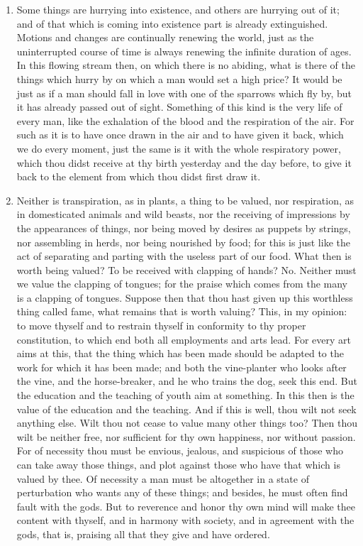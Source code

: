 \begin{enumerate}
\item Some things are hurrying into existence, and others are hurrying out of it; and of that which is coming into existence part is already extinguished. Motions and changes are continually renewing the world, just as the uninterrupted course of time is always renewing the infinite duration of ages. In this flowing stream then, on which there is no abiding, what is there of the things which hurry by on which a man would set a high price? It would be just as if a man should fall in love with one of the sparrows which fly by, but it has already passed out of sight. Something of this kind is the very life of every man, like the exhalation of the blood and the respiration of the air. For such as it is to have once drawn in the air and to have given it back, which we do every moment, just the same is it with the whole respiratory power, which thou didst receive at thy birth yesterday and the day before, to give it back to the element from which thou didst first draw it.

\item Neither is transpiration, as in plants, a thing to be valued, nor respiration, as in domesticated animals and wild beasts, nor the receiving of impressions by the appearances of things, nor being moved by desires as puppets by strings, nor assembling in herds, nor being nourished by food; for this is just like the act of separating and parting with the useless part of our food. What then is worth being valued? To be received with clapping of hands? No. Neither must we value the clapping of tongues; for the praise which comes from the many is a clapping of tongues. Suppose then that thou hast given up this worthless thing called fame, what remains that is worth valuing? This, in my opinion: to move thyself and to restrain thyself in conformity to thy proper constitution, to which end both all employments and arts lead. For every art aims at this, that the thing which has been made should be adapted to the work for which it has been made; and both the vine-planter who looks after the vine, and the horse-breaker, and he who trains the dog, seek this end. But the education and the teaching of youth aim at something. In this then is the value of the education and the teaching. And if this is well, thou wilt not seek anything else. Wilt thou not cease to value many other things too? Then thou wilt be neither free, nor sufficient for thy own happiness, nor without passion. For of necessity thou must be envious, jealous, and suspicious of those who can take away those things, and plot against those who have that which is valued by thee. Of necessity a man must be altogether in a state of perturbation who wants any of these things; and besides, he must often find fault with the gods. But to reverence and honor thy own mind will make thee content with thyself, and in harmony with society, and in agreement with the gods, that is, praising all that they give and have ordered.


\end{enumerate}
